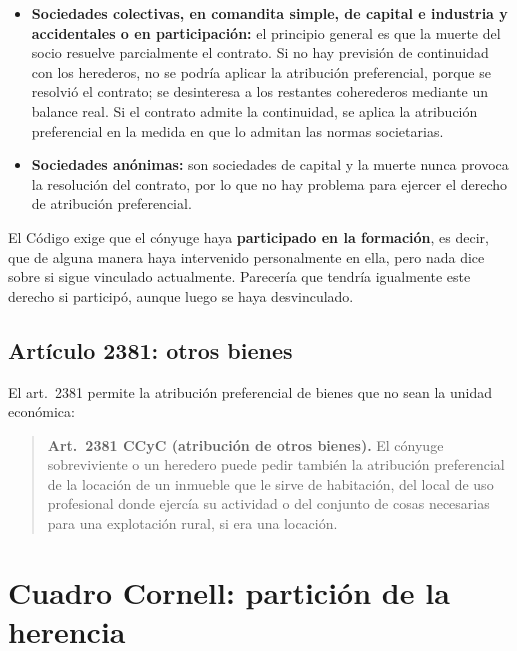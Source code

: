 \documentclass[12pt,oneside]{book}
\begin{document}
\begin{itemize}
    \item \textbf{Sociedades colectivas, en comandita simple, de capital e industria y accidentales o en participación:} el principio general es que la muerte del socio resuelve parcialmente el contrato. Si no hay previsión de continuidad con los herederos, no se podría aplicar la atribución preferencial, porque se resolvió el contrato; se desinteresa a los restantes coherederos mediante un balance real. Si el contrato admite la continuidad, se aplica la atribución preferencial en la medida en que lo admitan las normas societarias.
    \item \textbf{Sociedades anónimas:} son sociedades de capital y la muerte nunca provoca la resolución del contrato, por lo que no hay problema para ejercer el derecho de atribución preferencial.
\end{itemize}

El Código exige que el cónyuge haya \textbf{participado en la formación}, es decir, que de alguna manera haya intervenido personalmente en ella, pero nada dice sobre si sigue vinculado actualmente. Parecería que tendría igualmente este derecho si participó, aunque luego se haya desvinculado.

\subsection{Artículo 2381: otros bienes}

El art.~2381 permite la atribución preferencial de bienes que no sean la unidad económica:

\begin{quote}
\textbf{Art.~2381 CCyC (atribución de otros bienes).} El cónyuge sobreviviente o un heredero puede pedir también la atribución preferencial de la locación de un inmueble que le sirve de habitación, del local de uso profesional donde ejercía su actividad o del conjunto de cosas necesarias para una explotación rural, si era una locación.
\end{quote}

\section{Cuadro Cornell: partición de la herencia}
\end{document}
